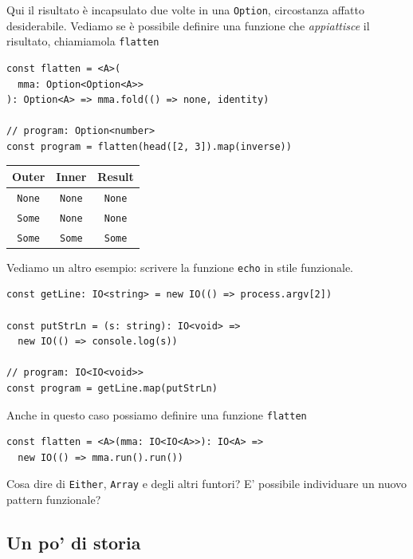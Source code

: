 \documentclass[12pt]{article}
\begin{document}
Qui il risultato è incapsulato due volte in una \texttt{Option}, circostanza affatto desiderabile.
Vediamo se è possibile definire una funzione che \emph{appiattisce} il risultato, chiamiamola \texttt{flatten}

\begin{verbatim}
const flatten = <A>(
  mma: Option<Option<A>>
): Option<A> => mma.fold(() => none, identity)

// program: Option<number>
const program = flatten(head([2, 3]).map(inverse))
\end{verbatim}

\begin{center}
\begin{tabular}{ c c c }
 Outer & Inner & Result \\
 \hline
 \texttt{None} & \texttt{None} & \texttt{None} \\
 \texttt{Some} & \texttt{None} & \texttt{None} \\
 \texttt{Some} & \texttt{Some} & \texttt{Some}
\end{tabular}
\end{center}

Vediamo un altro esempio: scrivere la funzione \texttt{echo} in stile funzionale.

\begin{verbatim}
const getLine: IO<string> = new IO(() => process.argv[2])

const putStrLn = (s: string): IO<void> =>
  new IO(() => console.log(s))

// program: IO<IO<void>>
const program = getLine.map(putStrLn)
\end{verbatim}

Anche in questo caso possiamo definire una funzione \texttt{flatten}

\begin{verbatim}
const flatten = <A>(mma: IO<IO<A>>): IO<A> =>
  new IO(() => mma.run().run())
\end{verbatim}

Cosa dire di \texttt{Either}, \texttt{Array} e degli altri funtori?
E' possibile individuare un nuovo pattern funzionale?

\subsection{Un po' di storia}
\end{document}
